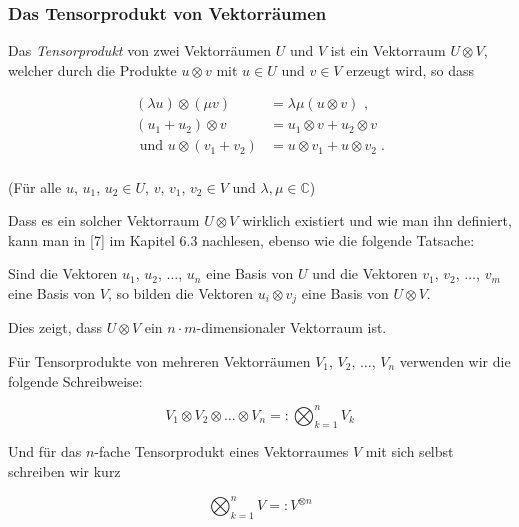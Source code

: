 \subsubsection{Das Tensorprodukt von Vektorräumen}

Das \textit{Tensorprodukt} von zwei Vektorräumen $U$ und $V$ ist ein Vektorraum $U\!\otimes\! V$, welcher durch die Produkte $u\otimes v$ mit $u\in U$ und $v\in V$ erzeugt wird, so dass 

\vspace{-0.5cm}
\[\begin{split} 
(\lambda u)\otimes (\mu v) &=\lambda \mu (u\otimes v)\text{ , }  \\[0.2cm]
(u_1+u_2)\otimes v &= u_1\otimes v + u_2\otimes v \\[0.2cm]
\text{ und }  u\otimes (v_1+v_2)&=u\otimes v_1 + u\otimes v_2 \; .\\
\end{split}\]

\vspace{-0.2cm}
\noindent (Für alle $u$, $u_1$, $u_2\in U$, $v$, $v_1$, $v_2\in V$ und $\lambda, \mu \in \mathbb{C}$)

\vspace{0.2cm}
\noindent Dass es ein solcher Vektorraum $U\otimes V$ wirklich existiert und wie man ihn definiert, kann man in [7] im Kapitel 6.3 nachlesen, ebenso wie die folgende Tatsache:

\vspace{0.2cm}
\noindent Sind die Vektoren $u_1$, $u_2$, $\ldots$, $u_n$ eine Basis von $U$ und die Vektoren $v_1$, $v_2$, $\ldots$, $v_m$ eine Basis von $V$, so bilden die Vektoren $u_i \otimes v_j$ eine Basis von $U\otimes V$. 
\vspace{0.1cm}

\noindent Dies zeigt, dass $U\otimes V$ ein $n\cdot m$-dimensionaler Vektorraum ist.

\vspace{0.3cm}
\noindent Für Tensorprodukte von mehreren Vektorräumen $V_1$, $V_2$, $\ldots$, $V_n$ verwenden wir die folgende Schreibweise:

\vspace{-0.7cm}
\[V_1\otimes V_2\otimes \ldots \otimes V_n=:\bigotimes_{k=1}^nV_k\]


\noindent Und für das $n$-fache Tensorprodukt eines Vektorraumes $V$ mit sich selbst schreiben wir kurz 

\vspace{-0.3cm}
\[\bigotimes_{k=1}^nV=:V^{\otimes n}\]


